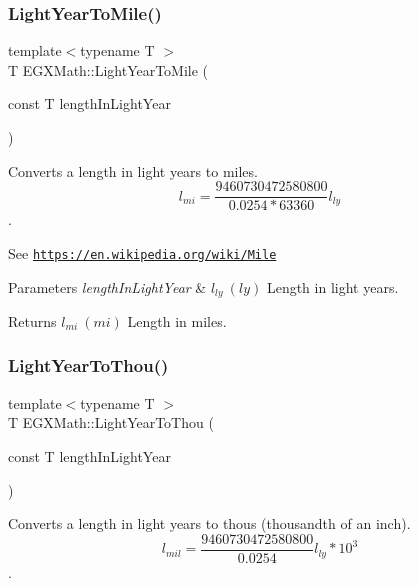 \subsubsection{\texorpdfstring{Light\+Year\+To\+Mile()}{LightYearToMile()}}
{\footnotesize\ttfamily template$<$typename T $>$ \\
T E\+G\+X\+Math\+::\+Light\+Year\+To\+Mile (\begin{DoxyParamCaption}\item[{const T}]{length\+In\+Light\+Year }\end{DoxyParamCaption})}



Converts a length in light years to miles. \[ l_{mi}=\frac{9460730472580800}{0.0254 * 63360} l_{ly} \]. 

See \href{https://en.wikipedia.org/wiki/Mile}{\tt https\+://en.\+wikipedia.\+org/wiki/\+Mile} 
\begin{DoxyParams}{Parameters}
{\em length\+In\+Light\+Year} & $ l_{ly}\ (ly)$ Length in light years. \\
\hline
\end{DoxyParams}
\begin{DoxyReturn}{Returns}
$ l_{mi}\ (mi)$ Length in miles. 
\end{DoxyReturn}
\mbox{\label{group___e_g_x_math-_conversions-_length_conversions-_astronomical-_light_year-_imperial_ga84d83b078dfeb11c1cdaca84b4f988cb}} 
\subsubsection{\texorpdfstring{Light\+Year\+To\+Thou()}{LightYearToThou()}}
{\footnotesize\ttfamily template$<$typename T $>$ \\
T E\+G\+X\+Math\+::\+Light\+Year\+To\+Thou (\begin{DoxyParamCaption}\item[{const T}]{length\+In\+Light\+Year }\end{DoxyParamCaption})}



Converts a length in light years to thous (thousandth of an inch). \[ l_{mil}= \frac{9460730472580800}{0.0254} l_{ly} * 10^{3} \]. 

